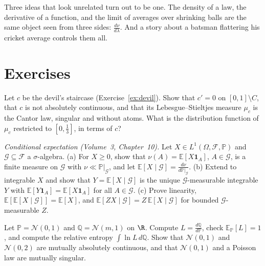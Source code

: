 \begin{beauty}
Three ideas that look unrelated turn out to be one. The density of a law, the derivative of a function, and the limit of averages over shrinking balls are the same object seen from three sides:
$\frac{d\nu}{d\lambda}$. And a story about a batsman flattering his cricket average controls them all.
\end{beauty}

\section{Exercises}

\begin{exercise}[$\star$]\label{ex:cantorfn}
Let $c$ be the devil's staircase (Exercise~\ref{ex:devil}). Show that $c'=0$ on $[0,1]\setminus C$, that $c$ is not absolutely continuous, and that its Lebesgue--Stieltjes measure $\mu_c$ is the Cantor law, singular
and without atoms. What is the distribution function of $\mu_c$ restricted to $[0,\frac13]$, in terms of $c$?
\end{exercise}

\begin{exercise}[$\star\star$]\label{ex:condexp}
\emph{Conditional expectation (Volume~3, Chapter~10).} Let $X\in L^1(\Omega,\mathcal F,\mathbb P)$ and $\mathcal G\subseteq\mathcal F$ a $\sigma$-algebra. (a) For $X\ge0$, show that $\nu(A)=\mathbb E[X\mathbf 1_A]$, $A\in\mathcal G$, is a finite
measure on $\mathcal G$ with $\nu\ll\mathbb P|_{\mathcal G}$, and let $\mathbb E[X\mid\mathcal G]=\frac{d\nu}{d\mathbb P|_{\mathcal G}}$. (b) Extend to integrable $X$ and show that $Y=\mathbb E[X\mid\mathcal G]$ is the unique $\mathcal G$-measurable
integrable $Y$ with $\mathbb E[Y\mathbf 1_A]=\mathbb E[X\mathbf 1_A]$ for all $A\in\mathcal G$. (c) Prove linearity, $\mathbb E[\mathbb E[X\mid\mathcal G]]=\mathbb E[X]$, and $\mathbb E[ZX\mid\mathcal G]=Z\,\mathbb E[X\mid\mathcal G]$ for bounded
$\mathcal G$-measurable $Z$.
\end{exercise}

\begin{exercise}[$\star$]\label{ex:likelihood}
Let $\mathbb P=\mathcal N(0,1)$ and $\mathbb Q=\mathcal N(m,1)$ on $\R$. Compute $L=\frac{d\mathbb Q}{d\mathbb P}$, check $\mathbb E_{\mathbb P}[L]=1$, and compute the relative entropy $\int\ln L\,d\mathbb Q$. Show that $\mathcal N(0,1)$ and
$\mathcal N(0,2)$ are mutually absolutely continuous, and that $\mathcal N(0,1)$ and a Poisson law are mutually singular.
\end{exercise}

